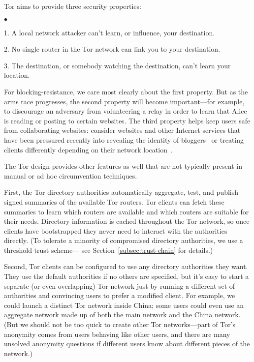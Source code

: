 \documentclass{llncs}
\newenvironment{tightlist}{\begin{list}{$\bullet$}{
  \setlength{\itemsep}{0mm}
    \setlength{\parsep}{0mm}
    }}{\end{list}}
\begin{document}
Tor aims to provide three security properties:
\begin{tightlist}
\item 1. A local network attacker can't learn, or influence, your
destination.
\item 2. No single router in the Tor network can link you to your
destination.
\item 3. The destination, or somebody watching the destination,
can't learn your location.
\end{tightlist}

For blocking-resistance, we care most clearly about the first
property. But as the arms race progresses, the second property
will become important---for example, to discourage an adversary
from volunteering a relay in order to learn that Alice is reading
or posting to certain websites. The third property helps keep users safe from
collaborating websites: consider websites and other Internet services 
that have been pressured
recently into revealing the identity of bloggers~\cite{arrested-bloggers}
or treating clients differently depending on their network
location~\cite{google-geolocation}.

The Tor design provides other features as well that are not typically
present in manual or ad hoc circumvention techniques.

First, the Tor directory authorities automatically aggregate, test,
and publish signed summaries of the available Tor routers. Tor clients
can fetch these summaries to learn which routers are available and
which routers are suitable for their needs. Directory information is cached
throughout the Tor network, so once clients have bootstrapped they never
need to interact with the authorities directly. (To tolerate a minority
of compromised directory authorities, we use a threshold trust scheme---
see Section~\ref{subsec:trust-chain} for details.)

Second, Tor clients can be configured to use any directory authorities
they want. They use the default authorities if no others are specified,
but it's easy to start a separate (or even overlapping) Tor network just
by running a different set of authorities and convincing users to prefer
a modified client. For example, we could launch a distinct Tor network
inside China; some users could even use an aggregate network made up of
both the main network and the China network. (But we should not be too
quick to create other Tor networks---part of Tor's anonymity comes from
users behaving like other users, and there are many unsolved anonymity
questions if different users know about different pieces of the network.)
\end{document}
